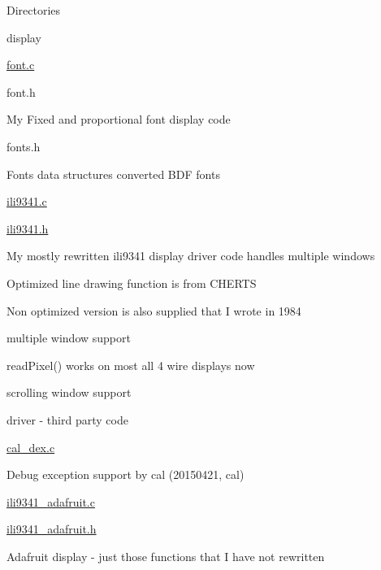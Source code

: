 \begin{DoxyParagraph}{Directories}
\begin{DoxyItemize}
\begin{DoxyItemize}
\begin{DoxyItemize}
\begin{DoxyItemize}
\end{DoxyItemize}
\end{DoxyItemize}
\end{DoxyItemize}
\item display
\begin{DoxyItemize}
\item \hyperlink{font_8c}{font.\-c}
\item font.\-h
\begin{DoxyItemize}
\item My Fixed and proportional font display code
\end{DoxyItemize}
\item fonts.\-h
\begin{DoxyItemize}
\item Fonts data structures converted B\-D\-F fonts
\end{DoxyItemize}
\item \hyperlink{ili9341_8c}{ili9341.\-c}
\item \hyperlink{ili9341_8h}{ili9341.\-h}
\begin{DoxyItemize}
\item My mostly rewritten ili9341 display driver code handles multiple windows
\begin{DoxyItemize}
\item Optimized line drawing function is from C\-H\-E\-R\-T\-S
\item Non optimized version is also supplied that I wrote in 1984
\item multiple window support
\item read\-Pixel() works on most all 4 wire displays now
\item scrolling window support
\end{DoxyItemize}
\end{DoxyItemize}
\end{DoxyItemize}
\item driver -\/ third party code
\begin{DoxyItemize}
\item \hyperlink{cal__dex_8c}{cal\-\_\-dex.\-c}
\begin{DoxyItemize}
\item Debug exception support by cal (20150421, cal)
\end{DoxyItemize}
\item \hyperlink{ili9341__adafruit_8c}{ili9341\-\_\-adafruit.\-c}
\item \hyperlink{ili9341__adafruit_8h}{ili9341\-\_\-adafruit.\-h}
\begin{DoxyItemize}
\item Adafruit display -\/ just those functions that I have not rewritten
\end{DoxyItemize}
\end{DoxyItemize}
\end{DoxyItemize}
\end{DoxyParagraph}

